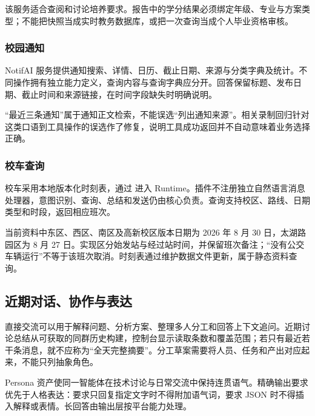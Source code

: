 该服务适合查阅和讨论培养要求。报告中的学分结果必须绑定年级、专业与方案类型；不能把快照当成实时教务数据库，或把一次查询当成个人毕业资格审核。

\subsubsection{校园通知}
NotifAI 服务提供通知搜索、详情、日历、截止日期、来源与分类字典及统计。不同操作拥有独立能力定义，查询内容与查询字典应分开。回答保留标题、发布日期、截止时间和来源链接，在时间字段缺失时明确说明。

“最近三条通知”属于通知正文检索，不能误选“列出通知来源”。相关录制回归针对这类口语到工具操作的误选作了修复，说明工具成功返回并不自动意味着业务选择正确。

\subsubsection{校车查询}
校车采用本地版本化时刻表，通过  进入 Runtime。插件不注册独立自然语言消息处理器，意图识别、查询、总结和发送仍由核心负责。查询支持校区、路线、日期类型和时段，返回相应班次。

当前资料中东区、西区、南区及高新校区版本日期为 2026 年 8 月 30 日，太湖路园区为 8 月 27 日。实现区分始发站与经过站时间，并保留班次备注；“没有公交车辆运行”不等于该班次取消。时刻表通过维护数据文件更新，属于静态资料查询。

\subsection{近期对话、协作与表达}
直接交流可以用于解释问题、分析方案、整理多人分工和回答上下文追问。近期讨论总结从可获取的同群历史构建，控制台显示读取条数和覆盖范围；若只有最近若干条消息，就不应称为“全天完整摘要”。分工草案需要将人员、任务和产出对应起来，不能只列抽象角色。

Persona 资产使同一智能体在技术讨论与日常交流中保持连贯语气。精确输出要求优先于人格表达：要求只回复指定文字时不得附加语气词，要求 JSON 时不得插入解释或表情。长回答由输出层按平台能力处理。

